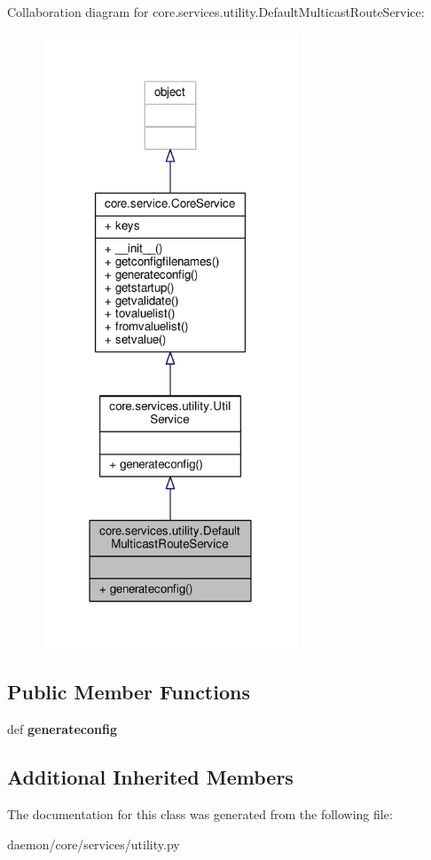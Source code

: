 Collaboration diagram for core.\+services.\+utility.\+Default\+Multicast\+Route\+Service\+:
\nopagebreak
\begin{figure}[H]
\begin{center}
\leavevmode
\includegraphics[width=216pt]{classcore_1_1services_1_1utility_1_1_default_multicast_route_service__coll__graph}
\end{center}
\end{figure}
\subsection*{Public Member Functions}
\begin{DoxyCompactItemize}
\item 
\hypertarget{classcore_1_1services_1_1utility_1_1_default_multicast_route_service_aaff240c777cfdfcc194e5407ffa7b1c0}{def {\bfseries generateconfig}}\label{classcore_1_1services_1_1utility_1_1_default_multicast_route_service_aaff240c777cfdfcc194e5407ffa7b1c0}

\end{DoxyCompactItemize}
\subsection*{Additional Inherited Members}


The documentation for this class was generated from the following file\+:\begin{DoxyCompactItemize}
\item 
daemon/core/services/utility.\+py\end{DoxyCompactItemize}

